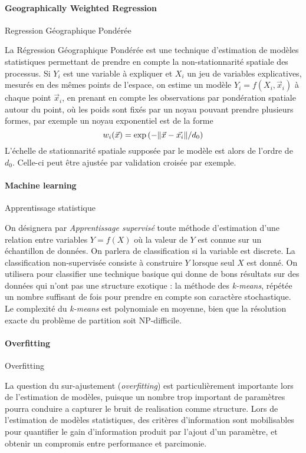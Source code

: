 \paragraph*{Geographically Weighted Regression}{Regression Géographique Pondérée}


La Régression Géographique Pondérée est une technique d'estimation de modèles statistiques permettant de prendre en compte la non-stationnarité spatiale des processus. Si $Y_i$ est une variable à expliquer et $X_i$ un jeu de variables explicatives, mesurés en des mêmes points de l'espace, on estime un modèle $Y_i = f(X_i,\vec{x}_i)$ à chaque point $\vec{x}_i$, en prenant en compte les observations par pondération spatiale autour du point, où les poids sont fixés par un noyau pouvant prendre plusieurs formes, par exemple un noyau exponentiel est de la forme
\[
w_i(\vec{x}) = \exp\left(- \| \vec{x} - \vec{x_i} \| / d_0\right)
\]
L'échelle de stationnarité spatiale supposée par le modèle est alors de l'ordre de $d_0$. Celle-ci peut être ajustée par validation croisée par exemple.




\paragraph*{Machine learning}{Apprentissage statistique}


On désignera par \emph{Apprentissage supervisé} toute méthode d'estimation d'une relation entre variables $Y=f(X)$ où la valeur de $Y$ est connue sur un échantillon de données. On parlera de classification si la variable est discrete. La classification non-supervisée consiste à construire $Y$ lorsque seul $X$ est donné. On utilisera pour classifier une technique basique qui donne de bons résultats sur des données qui n'ont pas une structure exotique : la méthode des \emph{k-means}, répétée un nombre suffisant de fois pour prendre en compte son caractère stochastique. Le complexité du \emph{k-means} est polynomiale en moyenne, bien que la résolution exacte du problème de partition soit NP-difficile.




\paragraph*{Overfitting}{Overfitting}


La question du sur-ajustement (\emph{overfitting}) est particulièrement importante lors de l'estimation de modèles, puisque un nombre trop important de paramètres pourra conduire a capturer le bruit de realisation comme structure. Lors de l'estimation de modèles statistiques, des critères d'information sont mobilisables pour quantifier le gain d'information produit par l'ajout d'un paramètre, et obtenir un compromis entre performance et parcimonie.


